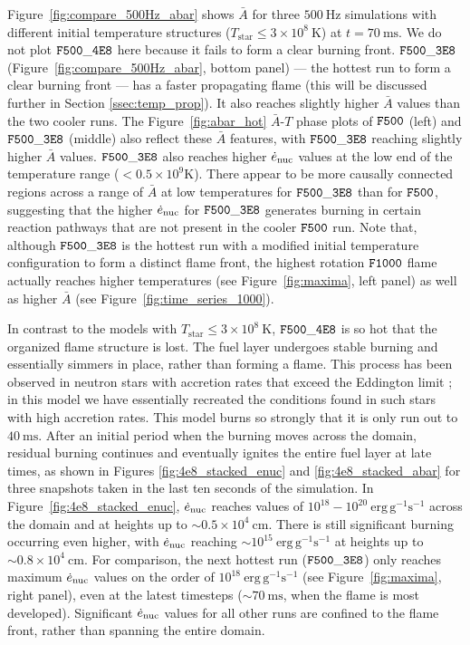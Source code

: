 \documentclass[preprint,times,tighten]{aastex63}
\newcommand{\enucdot}{\dot{e}_{\rm nuc}}
\begin{document}
Figure~\ref{fig:compare_500Hz_abar} shows $\bar{A}$ for three $500~\mathrm{Hz}$ simulations with different initial temperature structures ($T_{\mathrm{star}} \leq 3 \times 10^8~\mathrm{K}$) at $t = 70~\mathrm{ms}$. We do not plot $\tt{F500\_4E8}$ here because it fails to form a clear burning front. $\tt{F500\_3E8}$ (Figure~\ref{fig:compare_500Hz_abar}, bottom panel) --- the hottest run to form a clear burning front --- has a faster propagating flame (this will be discussed further in Section \ref{ssec:temp_prop}). It also reaches slightly higher $\bar{A}$ values than the two cooler runs. The Figure~\ref{fig:abar_hot} $\bar{A}$-$T$ phase plots of $\tt{F500}$ (left) and $\tt{F500\_3E8}$ (middle) also reflect these $\bar{A}$ features, with $\tt{F500\_3E8}$ reaching slightly higher $\bar{A}$ values. $\tt{F500\_3E8}$ also reaches higher $\enucdot$ values at the low end of the temperature range ($< 0.5 \times 10^9 \mathrm{K}$). There appear to be more causally connected regions across a range of $\bar{A}$ at low temperatures for $\tt{F500\_3E8}$ than for $\tt{F500}$, suggesting that the higher $\enucdot$ for $\tt{F500\_3E8}$ generates burning in certain reaction pathways that are not present in the cooler $\tt{F500}$ run. Note that, although $\tt{F500\_3E8}$ is the hottest run with a modified initial temperature configuration to form a distinct flame front, the highest rotation $\tt{F1000}$ flame actually reaches higher temperatures (see Figure~\ref{fig:maxima}, left panel) as well as higher $\bar{A}$ (see Figure~\ref{fig:time_series_1000}).


In contrast to the models with $T_{\mathrm{star}} \leq 3 \times 10^8~\mathrm{K}$, $\tt{F500\_4E8}$ 
is so hot that the organized flame structure is lost. The fuel layer undergoes stable burning and 
essentially simmers in place, rather than forming a flame. This process has been observed in 
neutron stars with accretion rates that exceed the Eddington limit 
\citep{fujimoto1981,bildsten1998thermonuclear,keek2009effect}; in this model we have essentially 
recreated the conditions found in such stars with high accretion rates. This model burns so 
strongly that it is only run out to $40~\mathrm{ms}$. After an initial period when the burning 
moves across the domain, residual burning continues and eventually ignites the entire fuel layer at 
late times, as shown in Figures \ref{fig:4e8_stacked_enuc} and \ref{fig:4e8_stacked_abar} for three 
snapshots taken in the last ten seconds of the simulation. In Figure~\ref{fig:4e8_stacked_enuc}, 
$\enucdot$ reaches values of $10^{18} - 10^{20}~\mathrm{erg}\,\mathrm{g}^{-1} \mathrm{s}^{-1}$ 
across the domain and at heights up to $\sim 0.5\times 10^4~\mathrm{cm}$. There is still 
significant burning occurring even higher, with $\enucdot$ reaching $\sim 
10^{15}~\mathrm{erg}\,\mathrm{g}^{-1} \mathrm{s}^{-1}$ at heights up to $\sim 0.8\times 
10^4~\mathrm{cm}$. For comparison, the next hottest run ($\tt{F500\_3E8}$) only reaches maximum 
$\enucdot$ values on the order of $10^{18}~\mathrm{erg}\,\mathrm{g}^{-1} \mathrm{s}^{-1}$ 
(see Figure~\ref{fig:maxima}, right panel), even at the latest timesteps ($\sim 
70~\mathrm{ms}$, when the flame is most developed). Significant $\enucdot$ values for 
all other runs are confined to the flame front, rather than spanning the entire domain.
\end{document}
